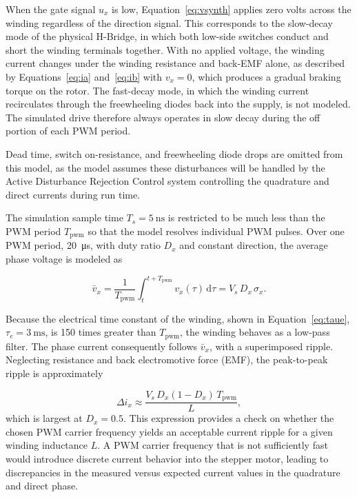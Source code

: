 When the gate signal $u_x$ is low, Equation~\eqref{eq:vsynth} applies zero volts across the winding regardless of the direction signal. This corresponds to the slow-decay mode of the physical H-Bridge, in which both low-side switches conduct and short the winding terminals together. With no applied voltage, the winding current changes under the winding resistance and back-EMF alone, as described by Equations~\eqref{eq:ia} and~\eqref{eq:ib} with $v_x = 0$, which produces a gradual braking torque on the rotor. The fast-decay mode, in which the winding current recirculates through the freewheeling diodes back into the supply, is not modeled. The simulated drive therefore always operates in slow decay during the off portion of each PWM period.

Dead time, switch on-resistance, and freewheeling diode drops are omitted from this model, as the model assumes these disturbances will be handled by the Active Disturbance Rejection Control system controlling the quadrature and direct currents during run time. 

The simulation sample time $T_s = \SI{5}{\nano\second}$ is restricted to be much less than the PWM period $T_{\mathrm{pwm}}$ so that the model resolves individual PWM pulses. Over one PWM period, \qty{20}{\micro\second}, with duty ratio $D_x$ and constant direction, the average phase voltage is modeled as

\begin{equation}
	\bar{v}_x = \frac{1}{T_{\mathrm{pwm}}} \int_{t}^{t + T_{\mathrm{pwm}}} v_x(\tau) \, \mathrm{d}\tau = V_s \, D_x \, \sigma_x .
	\label{eq:vavg}
\end{equation}

Because the electrical time constant of the winding, shown in Equation~\eqref{eq:taue}, $\tau_e = \SI{3}{\milli\second}$, is 150 times greater than $T_{\mathrm{pwm}}$, the winding behaves as a low-pass filter. The phase current consequently follows $\bar{v}_x$, with a superimposed ripple. Neglecting resistance and back electromotive force (EMF), the peak-to-peak ripple is approximately

\begin{equation}
	\Delta i_x \approx \frac{V_s \, D_x (1 - D_x) \, T_{\mathrm{pwm}}}{L},
	\label{eq:ripple}
\end{equation}
which is largest at $D_x = 0.5$. This expression provides a check on whether the chosen PWM carrier frequency yields an acceptable current ripple for a given winding inductance $L$. A PWM carrier frequency that is not sufficiently fast would introduce discrete current behavior into the stepper motor, leading to discrepancies in the measured versus expected current values in the quadrature and direct phase. 

